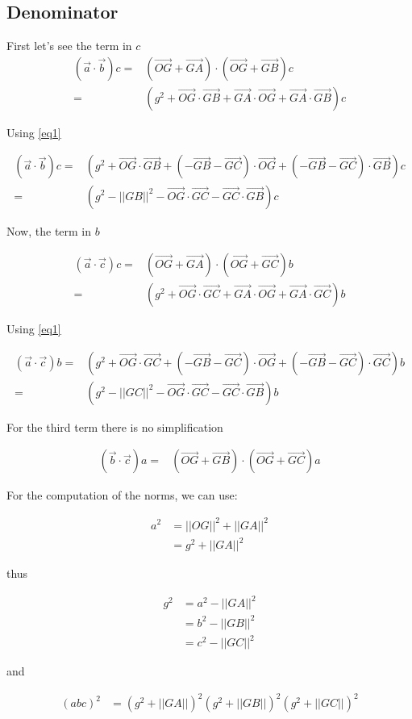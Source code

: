 \documentclass[10pt,a4paper]{article}
\begin{document}
\subsection{Denominator}


First let's see the term in $c$
\begin{align*}
 \left({\vec {a}}\cdot {\vec {b}}\right)c 
	=& \left( \vec{OG} + \vec{GA} \right) \cdot \left( \vec{OG} + \vec{GB} \right) c \\
	 =& (g^2 +  \vec{OG} \cdot \vec{GB}	+ \vec{GA} \cdot \vec{OG} + \vec{GA} \cdot \vec{GB}    ) c
\end{align*}

Using \eqref{eq1}

\begin{align}
 \left({\vec {a}}\cdot {\vec {b}}\right)c 
	 =& (g^2 +  \vec{OG} \cdot \vec{GB}	+ (-\vec{GB} - \vec{GC}) \cdot \vec{OG} + (-\vec{GB} - \vec{GC}) \cdot \vec{GB}    ) c \nonumber \\
	 =& (g^2 - ||GB||^2 - \vec{OG} \cdot \vec{GC} - \vec{GC} \cdot \vec{GB})c
\end{align}



Now, the term in $b$


\begin{align*}
 \left({\vec {a}}\cdot {\vec {c}}\right)c 
	=& \left( \vec{OG} + \vec{GA} \right) \cdot \left( \vec{OG} + \vec{GC} \right) b \\
	 =& (g^2 +  \vec{OG} \cdot \vec{GC}	+ \vec{GA} \cdot \vec{OG} + \vec{GA} \cdot \vec{GC}    ) b
\end{align*}

Using \eqref{eq1}

\begin{align}
 \left({\vec {a}}\cdot {\vec {c}}\right)b
	 =& (g^2 +  \vec{OG} \cdot \vec{GC}	+ (-\vec{GB} - \vec{GC}) \cdot \vec{OG} + (-\vec{GB} - \vec{GC}) \cdot \vec{GC}    ) b \nonumber \\
	 =& (g^2 - ||GC||^2 - \vec{OG} \cdot \vec{GC} - \vec{GC} \cdot \vec{GB})b
\end{align}


For the third term there is no simplification

\begin{align}
 \left({\vec {b}}\cdot {\vec {c}}\right)a 
	=& \left( \vec{OG} + \vec{GB} \right) \cdot \left( \vec{OG} + \vec{GC} \right) a
\end{align}


For the computation of the norms, we can use:

\begin{align*}
a^2 &= ||OG||^2 + ||GA||^2\\
    &=  g^2 + ||GA||^2
\end{align*}

thus

\begin{align}
g^2 &= a^2 - ||GA||^2 \nonumber \\ 
    &= b^2 - ||GB||^2 \nonumber \\
    &= c^2 - ||GC||^2
\end{align}

and

\begin{align}
(abc)^2 &= (g^2 + ||GA||)^2(g^2 + ||GB||)^2(g^2 + ||GC||)^2 
\end{align}
\end{document}
